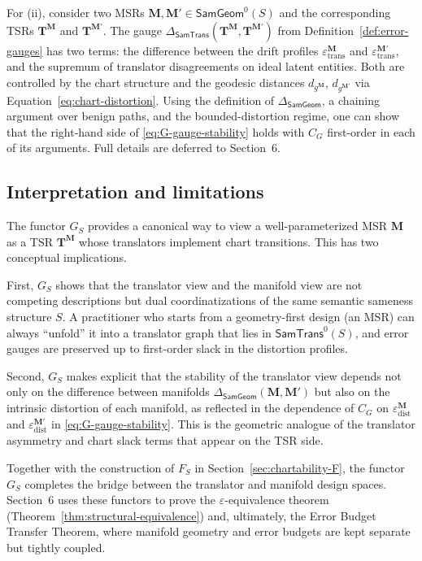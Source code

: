 \documentclass[11pt]{article}
\newcommand{\SamTrans}{\mathsf{SamTrans}}
\newcommand{\SamGeom}{\mathsf{SamGeom}}
\begin{document}
For (ii), consider two MSRs $\mathbf{M},\mathbf{M}'\in\SamGeom^0(S)$ and the
corresponding TSRs $\mathbf{T}^{\mathbf{M}}$ and
$\mathbf{T}^{\mathbf{M}'}$. The gauge
$\Delta_{\SamTrans}(\mathbf{T}^{\mathbf{M}},\mathbf{T}^{\mathbf{M}'})$ from
Definition~\ref{def:error-gauges} has two terms: the difference between the
drift profiles $\varepsilon_{\mathrm{trans}}^{\mathbf{M}}$ and
$\varepsilon_{\mathrm{trans}}^{\mathbf{M}'}$, and the supremum of translator
disagreements on ideal latent entities. Both are controlled by the chart
structure and the geodesic distances $d_{g^{\mathbf{M}}}$,
$d_{g^{\mathbf{M}'}}$ via Equation~\eqref{eq:chart-distortion}. Using the
definition of $\Delta_{\SamGeom}$, a chaining argument over benign paths,
and the bounded-distortion regime, one can show that the right-hand side of
\eqref{eq:G-gauge-stability} holds with $C_G$ first-order in each of its
arguments. Full details are deferred to Section~6. \qedhere

\subsection{Interpretation and limitations}
\label{subsec:G-discussion}

The functor $G_S$ provides a canonical way to view a well-parameterized MSR
$\mathbf{M}$ as a TSR $\mathbf{T}^{\mathbf{M}}$ whose translators implement
chart transitions. This has two conceptual implications.

First, $G_S$ shows that the translator view and the manifold view are not
competing descriptions but dual coordinatizations of the same semantic
sameness structure $S$. A practitioner who starts from a geometry-first
design (an MSR) can always ``unfold'' it into a translator graph that lies
in $\SamTrans^0(S)$, and error gauges are preserved up to first-order slack
in the distortion profiles.

Second, $G_S$ makes explicit that the stability of the translator view
depends not only on the difference between manifolds
$\Delta_{\SamGeom}(\mathbf{M},\mathbf{M}')$ but also on the intrinsic
distortion of each manifold, as reflected in the dependence of
$C_G$ on $\varepsilon_{\mathrm{dist}}^{\mathbf{M}}$ and
$\varepsilon_{\mathrm{dist}}^{\mathbf{M}'}$ in
\eqref{eq:G-gauge-stability}. This is the geometric analogue of the
translator asymmetry and chart slack terms that appear on the TSR side.

Together with the construction of $F_S$ in
Section~\ref{sec:chartability-F}, the functor $G_S$ completes the bridge
between the translator and manifold design spaces. Section~6 uses these
functors to prove the $\varepsilon$-equivalence theorem
(Theorem~\ref{thm:structural-equivalence}) and, ultimately, the Error Budget
Transfer Theorem, where manifold geometry and error budgets are kept
separate but tightly coupled.
\end{document}
